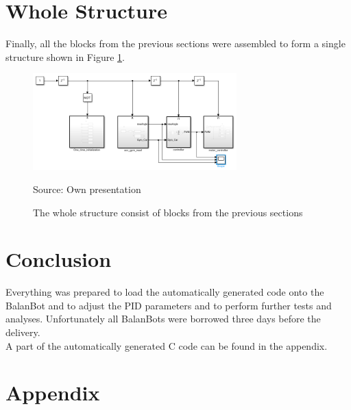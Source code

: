 \section{Whole Structure}
Finally, all the blocks from the previous sections were assembled to form a single structure shown in Figure \ref{fig:struct}.

	\begin{figure}[!htbp]
		\centering
		\includegraphics[width=0.7\textwidth]{figures/struct.PNG}
		\caption{The whole structure consist of blocks from the previous sections}	
		Source: Own presentation	
		\label{fig:struct}	
	\end{figure}


\section{Conclusion}
Everything was prepared to load the automatically generated code onto the BalanBot and to adjust the PID parameters and to perform further tests and analyses. Unfortunately all BalanBots were borrowed three days before the delivery.\\
A part of the automatically generated C code can be found in the appendix.


\cleardoublepage
\appendix
\section{Appendix}

